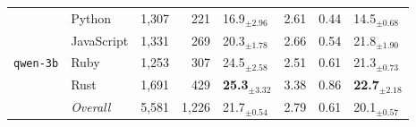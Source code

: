 \begin{longtable}{@{}llrrp{0.72cm}rrp{0.72cm}@{}}
    \midrule
      \multirow{5}{*}{\texttt{qwen-3b}} & Python & 1,307 & 221 & 16.9$_{\pm 2.96}$ & 2.61 & 0.44 & 14.5$_{\pm 0.68}$ \\
       & JavaScript & 1,331 & 269 & 20.3$_{\pm 1.78}$ & 2.66 & 0.54 & 21.8$_{\pm 1.90}$ \\
       & Ruby & 1,253 & 307 & 24.5$_{\pm 2.58}$ & 2.51 & 0.61 & 21.3$_{\pm 0.73}$ \\
       & Rust & 1,691 & 429 & \textbf{25.3$_{\pm 3.32}$} & 3.38 & 0.86 & \textbf{22.7$_{\pm 2.18}$} \\ \cmidrule(lr){2-8}
      & \textit{Overall} & 5,581 & 1,226 & 21.7$_{\pm 0.54}$ & 2.79 & 0.61 & 20.1$_{\pm 0.57}$ \\
\end{longtable}
